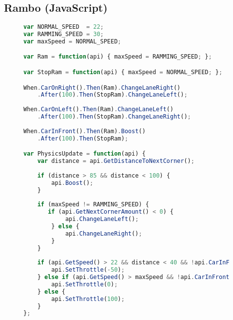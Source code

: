 \subsection{Rambo (JavaScript)}
\begin{figure}[H]
\begin{lstlisting}[language=JavaScript]
var NORMAL_SPEED  = 22;
var RAMMING_SPEED = 30;
var maxSpeed = NORMAL_SPEED; 

var Ram = function(api) { maxSpeed = RAMMING_SPEED; };

var StopRam = function(api) { maxSpeed = NORMAL_SPEED; };

When.CarOnRight().Then(Ram).ChangeLaneRight()
    .After(100).Then(StopRam).ChangeLaneLeft();
    
When.CarOnLeft().Then(Ram).ChangeLaneLeft()
    .After(100).Then(StopRam).ChangeLaneRight();
    
When.CarInFront().Then(Ram).Boost()
    .After(100).Then(StopRam);

var PhysicsUpdate = function(api) { 
    var distance = api.GetDistanceToNextCorner(); 
    
    if (distance > 85 && distance < 100) { 
        api.Boost(); 
    }
    
    if (maxSpeed != RAMMING_SPEED) {
       if (api.GetNextCornerAmount() < 0) { 
            api.ChangeLaneLeft(); 
        } else { 
            api.ChangeLaneRight(); 
        } 
    }
    
    if (api.GetSpeed() > 22 && distance < 40 && !api.CarInFront()) { 
        api.SetThrottle(-50); 
    } else if (api.GetSpeed() > maxSpeed && !api.CarInFront()) { 
        api.SetThrottle(0); 
    } else {
        api.SetThrottle(100);
    }
};
\end{lstlisting}
\end{figure}

